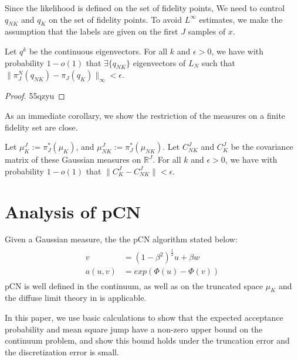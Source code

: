 \documentclass[final]{siamart0516}
\begin{document}
Since the likelihood is defined on the set of fidelity points, We need to control $q_{NK}$ and $q_K$ on the set of fidelity points. To avoid $L^\infty$ estimates, we make the assumption that the labels are given on the first $J$ samples of $x$. 
 
\begin{proposition}
Let $q^k$ be the continuous eigenvectors. For all $k$ and $\epsilon > 0$, we have with probability $1 - o(1)$ that $\exists \{q_{NK}\}$ eigenvectors of $L_N$ such that $\|\pi^N_J(q_{NK}) - \pi_J(q_K)\|_\infty < \epsilon$. 
\end{proposition}
\begin{proof}55qzyu 

\end{proof}

As an immediate corollary, we show the restriction of the measures on a finite fidelity set are close. 
\begin{corollary}
Let $\mu^J_K:= \pi_J^*(\mu_K)$, and $\mu^J_{NK}:=\pi_J^*(\mu_{NK})$. Let $C_{NK}^J$ and $C_K^J$ be the covariance matrix of these Gaussian measures on $\mathbb{R}^J$.   For all $k$ and $\epsilon > 0$, we have with probability $1 - o(1)$  that $\|C_K^J - C_{NK}^J\| < \epsilon$. 
\end{corollary}



\section{Analysis of pCN}
Given a Gaussian measure, the the pCN algorithm stated below:
\begin{align}
\begin{aligned}
v &= (1 - \beta^2)^{\frac{1}{2}}u + \beta w\\
a(u,v) &= exp(\Phi(u) - \Phi(v))
\end{aligned}
\end{align}
pCN is well defined in the continuum, as well as on the truncated space $\mu_{K}$ and the diffuse limit theory in \cite{pillai2011random} is applicable. 

In this paper, we use basic calculations to show that the expected acceptance probability and mean square jump have a non-zero upper bound on the continuum problem, and show this bound holds under the truncation error and the discretization error is small. 
\end{document}
